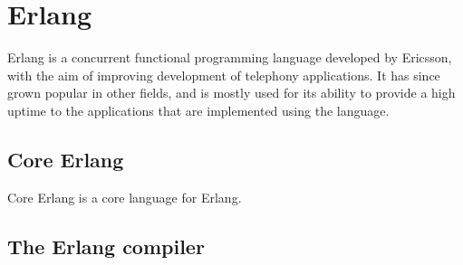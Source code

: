 \section{Erlang}

Erlang is a concurrent functional programming language developed by Ericsson, with the aim of improving
development of telephony applications. It has since grown popular in other fields, and is mostly used
for its ability to provide a high uptime to the applications that are implemented using the language.

\subsection{Core Erlang}
Core Erlang \cite{CoreErlangIntro} is a core language for Erlang.

\subsection{The Erlang compiler}
